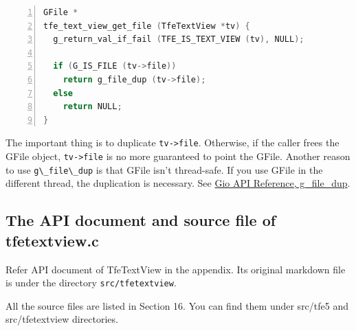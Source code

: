 \begin{lstlisting}[language=C, numbers=left]
GFile *
tfe_text_view_get_file (TfeTextView *tv) {
  g_return_val_if_fail (TFE_IS_TEXT_VIEW (tv), NULL);

  if (G_IS_FILE (tv->file))
    return g_file_dup (tv->file);
  else
    return NULL;
}
\end{lstlisting}

The important thing is to duplicate \passthrough{\lstinline!tv->file!}.
Otherwise, if the caller frees the GFile object,
\passthrough{\lstinline!tv->file!} is no more guaranteed to point the
GFile. Another reason to use \passthrough{\lstinline!g\_file\_dup!} is
that GFile isn't thread-safe. If you use GFile in the different thread,
the duplication is necessary. See
\href{https://docs.gtk.org/gio/method.File.dup.html}{Gio API Reference,
g\_file\_dup}.

\hypertarget{the-api-document-and-source-file-of-tfetextview.c}{%
\subsection{The API document and source file of
tfetextview.c}\label{the-api-document-and-source-file-of-tfetextview.c}}

Refer API document of TfeTextView in the appendix. Its original markdown
file is under the directory \passthrough{\lstinline!src/tfetextview!}.

All the source files are listed in Section 16. You can find them under
src/tfe5 and src/tfetextview directories.
